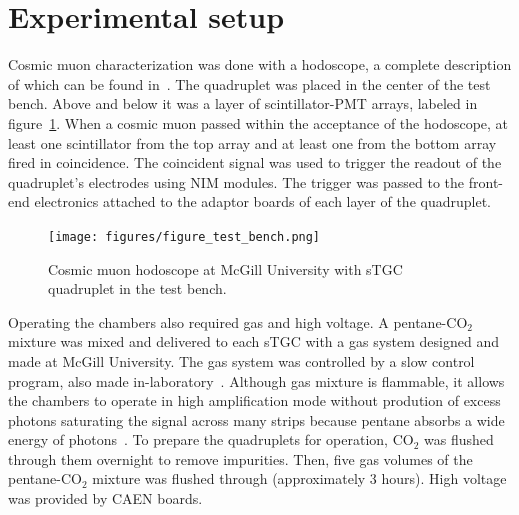 \section{Experimental setup}

Cosmic muon characterization was done with a hodoscope, a complete description of which can be found in~\cite{lefebvre_thesis}.  The quadruplet was placed in the center of the test bench. Above and below it was a layer of scintillator-PMT arrays, labeled in figure~\ref{fig:hodoscope}. When a cosmic muon passed within the acceptance of the hodoscope, at least one scintillator from the top array and at least one from the bottom array fired in coincidence. The coincident signal was used to trigger the readout of the quadruplet's electrodes using NIM modules. The trigger was passed to the front-end electronics attached to the adaptor boards of each layer of the quadruplet.

\begin{figure}
    \centering
    \texttt{[image: figures/figure\_test\_bench.png]}
    \caption{Cosmic muon hodoscope at McGill University with sTGC quadruplet in the test bench.}
    \label{fig:hodoscope}
\end{figure}

Operating the chambers also required gas and high voltage. A pentane-CO$_{2}$ mixture was mixed and delivered to each sTGC with a gas system designed and made at McGill University. The gas system was controlled by a slow control program, also made in-laboratory~\cite{keyes_development_2017}. Although gas mixture is flammable, it allows the chambers to operate in high amplification mode without prodution of excess photons saturating the signal across many strips because pentane absorbs a wide energy of photons~\cite{majewski_thin_1983}.  To prepare the quadruplets for operation, CO$_{2}$ was flushed through them overnight to remove impurities. Then, five gas volumes of the pentane-CO$_{2}$ mixture was flushed through (approximately 3 hours). High voltage was provided by CAEN boards. 


